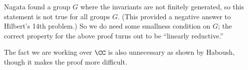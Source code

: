 \begin{remark}
	Nagata found a group $G$ where the invariants are not finitely generated, so this statement is not true for all groups $G.$ (This provided a negative answer to Hilbert's 14th problem.) So we do need some smallness condition on $G$; the correct property for the above proof turns out to be ``linearly reductive.''
\end{remark}
\begin{remark}
	The fact we are working over $\CC$ is also unnecessary as shown by Haboush, though it makes the proof more difficult.
\end{remark}